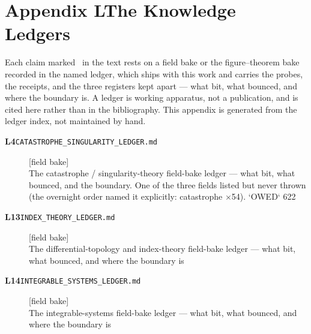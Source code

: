 \clearpage
\section*{Appendix L\quad The Knowledge Ledgers}\label{app:ledgers}
\small\noindent Each claim marked \ldgmarker\ in the text rests on a field bake or the figure--theorem bake recorded in the named ledger, which ships with this work and carries the probes, the receipts, and the three registers kept apart --- what bit, what bounced, and where the boundary is. A ledger is working apparatus, not a publication, and is cited here rather than in the bibliography. This appendix is generated from the ledger index, not maintained by hand.\par\medskip
\begingroup\renewcommand{\arraystretch}{1.25}
\begin{description}
\item[\textbf{L4}\quad\texttt{CATASTROPHE\_SINGULARITY\_LEDGER.md}]\hfill\textsf{[field bake]}\\
The catastrophe / singularity-theory field-bake ledger --- what bit, what bounced, and the boundary. One of the three fields listed but never thrown (the overnight order named it explicitly: catastrophe $\times$54). `OWED` 622
\item[\textbf{L13}\quad\texttt{INDEX\_THEORY\_LEDGER.md}]\hfill\textsf{[field bake]}\\
The differential-topology and index-theory field-bake ledger --- what bit, what bounced, and where the boundary is
\item[\textbf{L14}\quad\texttt{INTEGRABLE\_SYSTEMS\_LEDGER.md}]\hfill\textsf{[field bake]}\\
The integrable-systems field-bake ledger --- what bit, what bounced, and where the boundary is
\end{description}
\endgroup
